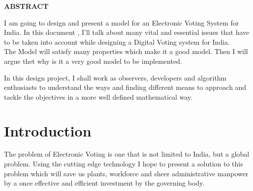 \documentclass[12pt]{report}
\begin{document}
\newpage

\begin{center}
\Large \bf ABSTRACT
\end{center}
\vspace{0.2in}

I am going to design and present a model for an Electronic Voting System for India. In this document , I'll talk about many vital and essential issues that have to be taken into account while designing a Digital Voting system for India. 
\\
\vspace{0.3cm}
The Model will satisfy many properties which make it a good model. Then I will argue thet why is it a very good model to be implemented.



In this design project, I shall work as observers, developers and algorithm enthusiasts to understand the ways and finding different means to approach and tackle the objectives in a more well defined mathematical way. 

\vspace{0.2cm}

\newpage

\tableofcontents

\newpage

\chapter{Introduction}

The problem of Electronic Voting is one that is not limited to India, but a global problem. Using the cutting edge technology I hope to present a solution to this problem which will save us plants, workforce and sheer administrative manpower by a once effective and efficient investment by the governing body.
\\
\end{document}
